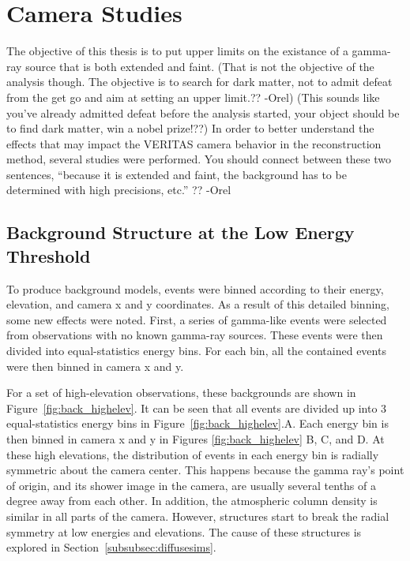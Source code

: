   \FloatBarrier

\section{Camera Studies}
  The objective of this thesis is to put upper limits on the existance of a gamma-ray source that is both extended and faint.
  {\color{red}(That is not the objective of the analysis though. The objective is to search for dark matter, not to admit defeat from the get go and aim at setting an upper limit.?? -Orel) (This sounds like you've already admitted defeat before the analysis started, your object should be to find dark matter, win a nobel prize!??)}
  In order to better understand the effects that may impact the VERITAS camera behavior in the reconstruction method, several studies were performed.
  {\color{red} You should connect between these two sentences, “because it is extended and faint, the background has to be determined with high precisions, etc.” ?? -Orel}

  \subsection{Background Structure at the Low Energy Threshold}\label{subsec:bkgstructure}
    To produce background models, events were binned according to their energy, elevation, and camera x and y coordinates.
    As a result of this detailed binning, some new effects were noted.
    First, a series of gamma-like events were selected from observations with no known gamma-ray sources.
    These events were then divided into equal-statistics energy bins.
    For each bin, all the contained events were then binned in camera x and y.

    For a set of high-elevation observations, these backgrounds are shown in Figure~\ref{fig:back_highelev}.
    It can be seen that all events are divided up into 3 equal-statistics energy bins in Figure~\ref{fig:back_highelev}.A.
    Each energy bin is then binned in camera x and y in Figures \ref{fig:back_highelev} B, C, and D.
    At these high elevations, the distribution of events in each energy bin is radially symmetric about the camera center.
    This happens because the gamma ray's point of origin, and its shower image in the camera, are usually several tenths of a degree away from each other.
    In addition, the atmospheric column density is similar in all parts of the camera.
    However, structures start to break the radial symmetry at low energies and elevations.
    The cause of these structures is explored in Section~\ref{subsubsec:diffusesims}.

